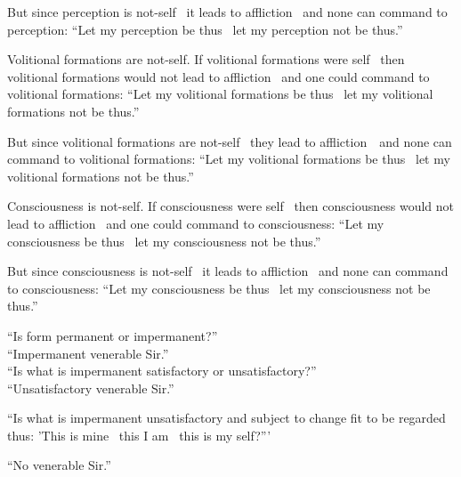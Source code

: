 \begin{english-only-hang}
But since perception is not-self \breathmark\ it leads to affliction \breathmark\ and none can command to perception: ``Let my perception be thus \breathmark\ let my perception not be thus.''
\end{english-only-hang}

\begin{english-only-hang}
Volitional formations are not-self. If volitional formations were self \breathmark\ then volitional formations would not lead to affliction \breathmark\ and one could command to volitional formations: ``Let my volitional formations be thus \breathmark\ let my volitional formations not be thus.''
\end{english-only-hang}

\begin{english-only-hang}
But since volitional formations are not-self \breathmark\ they lead to \mbox{affliction}~\breathmark\ and none can command to volitional formations: ``Let my volitional formations be thus \breathmark\ let my volitional formations not be thus.''
\end{english-only-hang}

\begin{english-only-hang}
Consciousness is not-self. If consciousness were self \breathmark\ then consciousness would not lead to affliction \breathmark\ and one could command to consciousness: ``Let my consciousness be thus \breathmark\ let my consciousness not be thus.''
\end{english-only-hang}

\begin{english-only-hang}
But since consciousness is not-self \breathmark\ it leads to affliction \breathmark\ and none can command to consciousness: ``Let my consciousness be thus \breathmark\ let my consciousness not be thus.''
\end{english-only-hang}
\begin{english-only-nohang}
 ``Is form permanent or impermanent?''\\

``Impermanent venerable Sir.''\\

``Is what is impermanent satisfactory or unsatisfactory?''\\

``Unsatisfactory venerable Sir.''\\

\begin{english-hangtogether}
``Is what is impermanent unsatisfactory and subject to change fit to be regarded thus: 'This is mine \breathmark\ this I am \breathmark\ this is my self?'''
\end{english-hangtogether}

``No venerable Sir.''
\end{english-only-nohang}

